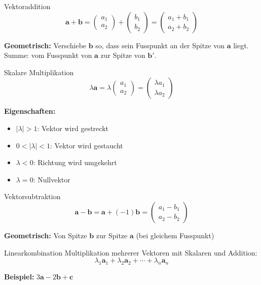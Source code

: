\documentclass[a4paper, fontsize=7pt]{scrartcl}
\begin{document}
\begin{mainbox}{Vektoraddition}
$$\mathbf{a} + \mathbf{b} = \begin{pmatrix} a_1 \\ a_2 \end{pmatrix} + \begin{pmatrix} b_1 \\ b_2 \end{pmatrix} = \begin{pmatrix} a_1 + b_1 \\ a_2 + b_2 \end{pmatrix}$$

\textbf{Geometrisch:} Verschiebe $\mathbf{b}$ so, dass sein Fusspunkt an der Spitze von $\mathbf{a}$ liegt. Summe: vom Fusspunkt von $\mathbf{a}$ zur Spitze von $\mathbf{b}'$.
\end{mainbox}

\begin{mainbox}{Skalare Multiplikation}
$$\lambda \mathbf{a} = \lambda \begin{pmatrix} a_1 \\ a_2 \end{pmatrix} = \begin{pmatrix} \lambda a_1 \\ \lambda a_2 \end{pmatrix}$$

\textbf{Eigenschaften:}
\begin{itemize}
    \item $|\lambda| > 1$: Vektor wird gestreckt
    \item $0 < |\lambda| < 1$: Vektor wird gestaucht
    \item $\lambda < 0$: Richtung wird umgekehrt
    \item $\lambda = 0$: Nullvektor
\end{itemize}
\end{mainbox}

\begin{mainbox}{Vektorsubtraktion}
$$\mathbf{a} - \mathbf{b} = \mathbf{a} + (-1)\mathbf{b} = \begin{pmatrix} a_1 - b_1 \\ a_2 - b_2 \end{pmatrix}$$

\textbf{Geometrisch:} Von Spitze $\mathbf{b}$ zur Spitze $\mathbf{a}$ (bei gleichem Fusspunkt)
\end{mainbox}

\begin{mainbox}{Linearkombination}
Multiplikation mehrerer Vektoren mit Skalaren und Addition:
$$\lambda_1 \mathbf{a}_1 + \lambda_2 \mathbf{a}_2 + \cdots + \lambda_n \mathbf{a}_n$$

\textbf{Beispiel:} $3\mathbf{a} - 2\mathbf{b} + \mathbf{c}$
\end{mainbox}
\end{document}

